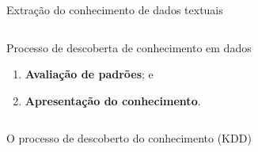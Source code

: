 \documentclass[%
  10pt,%
  aspectratio = 169,%
  compress,%
  t,%
]{beamer}%
\begin{document}
\begin{frame}[fragile = singleslide]{}{Extração do conhecimento de dados textuais}
\begin{columns}[t]
\begin{block}{Processo de descoberta de conhecimento em dados}
\begin{enumerate}
                \item \textbf{Avaliação de padrões}; e %
                \item \textbf{Apresentação do conhecimento}. %
            \end{enumerate}
        \end{block}
        \end{columns}
    \end{frame}
    
    \begin{frame}[fragile = singleslide]{}{O processo de descoberto do conhecimento (KDD)}
        
    \end{frame}
    
\end{document}
